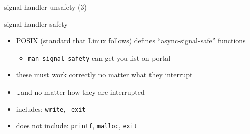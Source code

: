 \begin{frame}{signal handler unsafety (3)}

\end{frame}

\begin{frame}{signal handler safety}
\begin{itemize}
\item POSIX (standard that Linux follows) defines ``async-signal-safe'' functions
    \begin{itemize}
    \item \texttt{man signal-safety} can get you list on portal
    \end{itemize}
\item these must work correctly no matter what they interrupt
\item \ldots and no matter how they are interrupted
\item includes: {\tt write}, {\tt \_exit}
\item does not include: {\tt printf}, {\tt malloc}, {\tt exit}
\end{itemize}
\end{frame}


